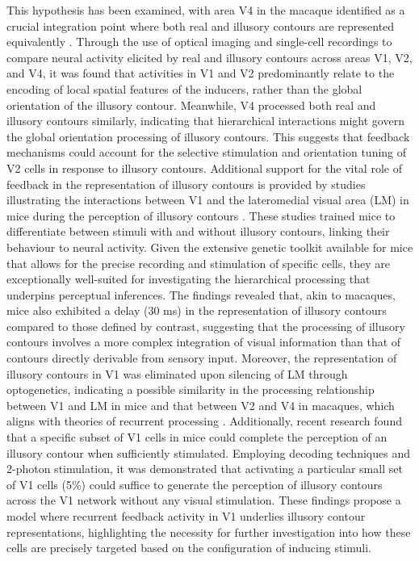 \documentclass[12pt]{article}
\begin{document}
This hypothesis has been examined, with area V4 in the macaque identified as a crucial integration point where both real and illusory contours are represented equivalently \autocite{panEquivalentRepresentationReal2012}. Through the use of optical imaging and single-cell recordings to compare neural activity elicited by real and illusory contours across areas V1, V2, and V4, it was found that activities in V1 and V2 predominantly relate to the encoding of local spatial features of the inducers, rather than the global orientation of the illusory contour. Meanwhile, V4 processed both real and illusory contours similarly, indicating that hierarchical interactions might govern the global orientation processing of illusory contours. This suggests that feedback mechanisms could account for the selective stimulation and orientation tuning of V2 cells in response to illusory contours. Additional support for the vital role of feedback in the representation of illusory contours is provided by studies illustrating the interactions between V1 and the lateromedial visual area (LM) in mice during the perception of illusory contours \autocite{pakTopDownFeedbackControls2020}. These studies trained mice to differentiate between stimuli with and without illusory contours, linking their behaviour to neural activity. Given the extensive genetic toolkit available for mice that allows for the precise recording and stimulation of specific cells, they are exceptionally well-suited for investigating the hierarchical processing that underpins perceptual inferences. The findings revealed that, akin to macaques, mice also exhibited a delay (30 ms) in the representation of illusory contours compared to those defined by contrast, suggesting that the processing of illusory contours involves a more complex integration of visual information than that of contours directly derivable from sensory input. Moreover, the representation of illusory contours in V1 was eliminated upon silencing of LM through optogenetics, indicating a possible similarity in the processing relationship between V1 and LM in mice and that between V2 and V4 in macaques, which aligns with theories of recurrent processing \autocite{wyatteEarlyRecurrentFeedback2014}. Additionally, recent research \cite{shinRecurrentPatternCompletion2023} found that a specific subset of V1 cells in mice could complete the perception of an illusory contour when sufficiently stimulated. Employing decoding techniques and 2-photon stimulation, it was demonstrated that activating a particular small set of V1 cells (5\%) could suffice to generate the perception of illusory contours across the V1 network without any visual stimulation. These findings propose a model where recurrent feedback activity in V1 underlies illusory contour representations, highlighting the necessity for further investigation into how these cells are precisely targeted based on the configuration of inducing stimuli.
\end{document}
